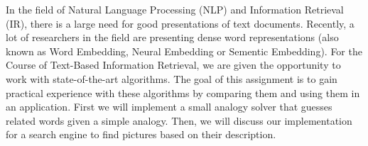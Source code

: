 In the field of Natural Language Processing (NLP) and Information Retrieval (IR), there is a large need for good presentations of text documents. Recently, a lot of researchers in the field are presenting dense word representations (also known as Word Embedding, Neural Embedding or Sementic Embedding).
For the Course of Text-Based Information Retrieval, we are given the opportunity to work with state-of-the-art algorithms. The goal of this assignment is to gain practical experience with these algorithms by comparing them and using them in an application.
First we will implement a small analogy solver that guesses related words given a simple analogy. Then, we will discuss our implementation for a search engine to find pictures based on their description.
